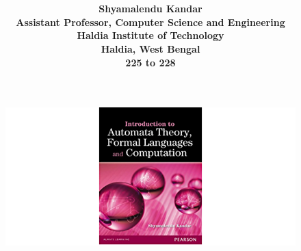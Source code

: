 \documentclass[a4paper,twoside,12pt]{book}
\begin{document}
\parindent 10pt

\title{\Huge\bf {}}
\author{\Large\bf{Shyamalendu Kandar}\\{Assistant Professor, Computer Science and Engineering}\\ {Haldia Institute of Technology}\\{Haldia, West Bengal}\\{\bf{225 to 228}}}
\maketitle
\begin{figure}
\centering
 \includegraphics[scale=1]{image/introduction/book}
\end{figure}

%


\mainmatter

%
%
%
%
%
%
%
%
%
%
%
%

%
%
\end{document}
